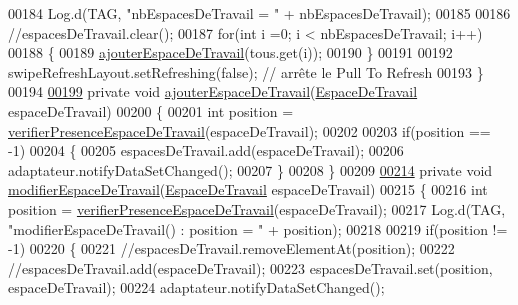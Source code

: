 \begin{DoxyCode}
00184         Log.d(TAG, \textcolor{stringliteral}{"nbEspacesDeTravail = "} + nbEspacesDeTravail);
00185 
00186         \textcolor{comment}{//espacesDeTravail.clear();}
00187         \textcolor{keywordflow}{for}(\textcolor{keywordtype}{int} i =0; i < nbEspacesDeTravail; i++)
00188         \{
00189             \hyperlink{classcom_1_1lasalle_1_1meeting_1_1_i_h_m_meeting_ad9ff630d7dc8df0155e3a552bfdfed75}{ajouterEspaceDeTravail}(tous.get(i));
00190         \}
00191 
00192         swipeRefreshLayout.setRefreshing(\textcolor{keyword}{false}); \textcolor{comment}{// arrête le Pull To Refresh}
00193     \}
00194 
\hyperlink{classcom_1_1lasalle_1_1meeting_1_1_i_h_m_meeting_ad9ff630d7dc8df0155e3a552bfdfed75}{00199}     \textcolor{keyword}{private} \textcolor{keywordtype}{void} \hyperlink{classcom_1_1lasalle_1_1meeting_1_1_i_h_m_meeting_ad9ff630d7dc8df0155e3a552bfdfed75}{ajouterEspaceDeTravail}(\hyperlink{classcom_1_1lasalle_1_1meeting_1_1_espace_de_travail}{EspaceDeTravail} 
      espaceDeTravail)
00200     \{
00201         \textcolor{keywordtype}{int} position = \hyperlink{classcom_1_1lasalle_1_1meeting_1_1_i_h_m_meeting_a402dc23f375fae1f1faa3d5728cdad00}{verifierPresenceEspaceDeTravail}(espaceDeTravail);
00202 
00203         \textcolor{keywordflow}{if}(position == -1)
00204         \{
00205             espacesDeTravail.add(espaceDeTravail);
00206             adaptateur.notifyDataSetChanged();
00207         \}
00208     \}
00209 
\hyperlink{classcom_1_1lasalle_1_1meeting_1_1_i_h_m_meeting_a3367c0a9b9743ca7808cb2265789f9b8}{00214}     \textcolor{keyword}{private} \textcolor{keywordtype}{void} \hyperlink{classcom_1_1lasalle_1_1meeting_1_1_i_h_m_meeting_a3367c0a9b9743ca7808cb2265789f9b8}{modifierEspaceDeTravail}(\hyperlink{classcom_1_1lasalle_1_1meeting_1_1_espace_de_travail}{EspaceDeTravail} 
      espaceDeTravail)
00215     \{
00216         \textcolor{keywordtype}{int} position = \hyperlink{classcom_1_1lasalle_1_1meeting_1_1_i_h_m_meeting_a402dc23f375fae1f1faa3d5728cdad00}{verifierPresenceEspaceDeTravail}(espaceDeTravail);
00217         Log.d(TAG, \textcolor{stringliteral}{"modifierEspaceDeTravail() : position = "} + position);
00218 
00219         \textcolor{keywordflow}{if}(position != -1)
00220         \{
00221             \textcolor{comment}{//espacesDeTravail.removeElementAt(position);}
00222             \textcolor{comment}{//espacesDeTravail.add(espaceDeTravail);}
00223             espacesDeTravail.set(position, espaceDeTravail);
00224             adaptateur.notifyDataSetChanged();

\end{DoxyCode}
